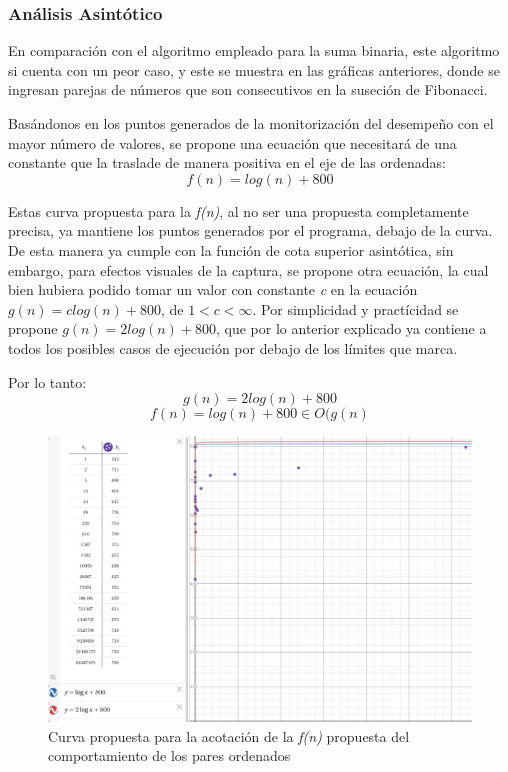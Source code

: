 \documentclass{report}
\begin{document}
        \begin{landscape}
        \subsubsection*{Análisis Asintótico}
            En comparación con el algoritmo empleado para la suma binaria, este algoritmo si cuenta con un peor caso, y este se muestra en las gráficas anteriores, donde se ingresan parejas de números que son consecutivos en la  suseción de Fibonacci.
            
            Basándonos en los puntos generados de la monitorización del desempeño con el mayor número de valores, se propone una ecuación que necesitará de una constante que la traslade de manera positiva en el eje de las ordenadas:
            $$f(n)=log(n)+800 $$
            
            Estas curva propuesta para la \textit{f(n)}, al no ser una propuesta completamente precisa, ya mantiene los puntos generados por el programa, debajo de la curva. De esta manera ya cumple con la función de cota superior asintótica, sin embargo, para efectos visuales de la captura, se propone otra ecuación, la cual bien hubiera podido tomar un valor con constante \textit{c} en la ecuación $g(n)=clog(n)+800$, de $1 < c <  \infty$. Por simplicidad y practícidad se propone $g(n)=2log(n)+800$, que por lo anterior explicado ya contiene a todos los posibles casos de ejecución por debajo de los límites que marca.
            
            Por lo tanto:
            $$g(n)=2log(n)+800$$
            $$f(n)=log(n)+800 \in O(g(n)$$
            
            
                \begin{figure}[!h]
                	\centering
                	\includegraphics[width=15cm]{Imagenes/Acotacion-Euclides.png}
                    \caption{Curva propuesta para la acotación de la \textit{f(n)} propuesta del comportamiento de los pares ordenados}
                \end{figure}
            \end{landscape}
        
\end{document}
